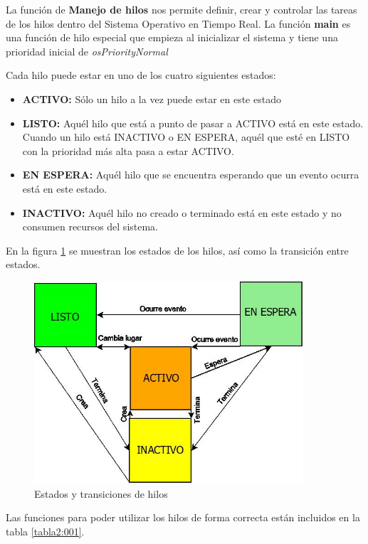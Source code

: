 \documentclass[12pt, twoside]{report}
\begin{document}
La función de \textbf{Manejo de hilos} nos permite definir, crear y controlar las tareas de los hilos dentro del Sistema Operativo en Tiempo Real. La función \textbf{main} es una función de hilo especial que empieza al inicializar el sistema y tiene una prioridad inicial de \textit{osPriorityNormal}


Cada hilo puede estar en uno de los cuatro siguientes estados:

\begin{itemize}
	\item \textbf{ACTIVO:} Sólo un hilo a la vez puede estar en este estado
	\item \textbf{LISTO:} Aquél hilo que está a punto de pasar a ACTIVO está en este estado. Cuando un hilo está INACTIVO o EN ESPERA, aquél que esté en LISTO con la prioridad más alta pasa a estar ACTIVO.
	\item \textbf{EN ESPERA:} Aquél hilo que se encuentra esperando que un evento ocurra está en este estado.
	\item \textbf{INACTIVO:} Aquél hilo no creado o terminado está en este estado y no consumen recursos del sistema.
\end{itemize} 

En la figura \ref{cap2:001} se muestran los estados de los hilos, así como la transición entre estados.

\begin{figure}[H]
	\centering
	\includegraphics[width=100mm]{estados}
	\caption{Estados y transiciones de hilos}
	\label{cap2:001}
\end{figure}

Las funciones para poder utilizar los hilos de forma correcta están incluidos en la  tabla \ref{tabla2:001}.
\end{document}
